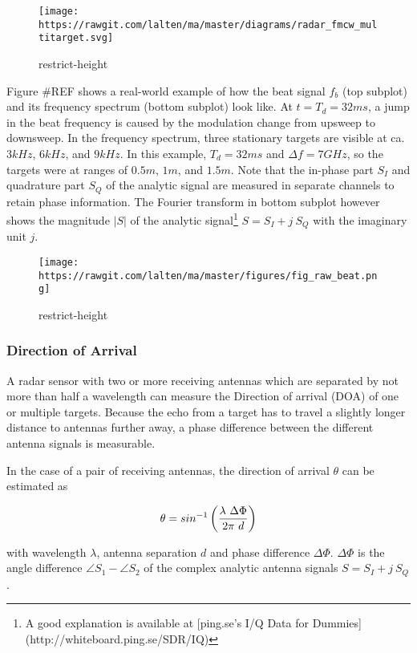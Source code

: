 \begin{figure}
\centering
\texttt{[image: https://rawgit.com/lalten/ma/master/diagrams/radar\_fmcw\_multitarget.svg]}
\caption{restrict-height}
\end{figure}

Figure \#REF shows a real-world example of how the beat signal \(f_b\)
(top subplot) and its frequency spectrum (bottom subplot) look like. At
\(t=T_d=32ms\), a jump in the beat frequency is caused by the modulation
change from upsweep to downsweep. In the frequency spectrum, three
stationary targets are visible at ca. \(3kHz\), \(6kHz\), and \(9kHz\).
In this example, \(T_d=32ms\) and \(\Delta f=7GHz\), so the targets were
at ranges of \(0.5m\), \(1m\), and \(1.5m\). Note that the in-phase part
\(S_I\) and quadrature part \(S_Q\) of the analytic signal are measured
in separate channels to retain phase information. The Fourier transform
in bottom subplot however shows the magnitude \(|S|\) of the analytic
signal\footnote{A good explanation is available at [ping.se's I/Q Data for Dummies](http://whiteboard.ping.se/SDR/IQ)}
\(S = S_I + j~S_Q\) with the imaginary unit \(j\).

\begin{figure}
\centering
\texttt{[image: https://rawgit.com/lalten/ma/master/figures/fig\_raw\_beat.png]}
\caption{restrict-height}
\end{figure}

\subsubsection{Direction of Arrival}\label{direction-of-arrival}

A radar sensor with two or more receiving antennas which are separated
by not more than half a wavelength can measure the Direction of arrival
(DOA) of one or multiple targets. Because the echo from a target has to
travel a slightly longer distance to antennas further away, a phase
difference between the different antenna signals is measurable.

In the case of a pair of receiving antennas, the direction of arrival
\(\theta\) can be estimated \cite{VanZeijl2014} as

\[\theta = sin^{-1}\left({{\lambda~\Delta\Phi}\over{2\pi ~d}}\right)\]

with wavelength \(\lambda\), antenna separation \(d\) and phase
difference \(\Delta\Phi\). \(\Delta\Phi\) is the angle difference
\(\angle S_1 - \angle S_2\) of the complex analytic antenna signals
\(S = S_I + j~S_Q\).

